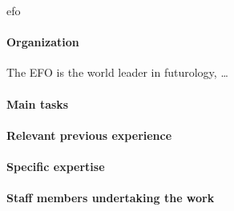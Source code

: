 \begin{sitedescription}{efo}
\paragraph{Organization}
 The EFO is the world leader in futurology, \ldots
\paragraph{Main tasks}
\paragraph{Relevant previous experience}
\paragraph{Specific expertise}
\paragraph{Staff members undertaking the work}
\end{sitedescription}

